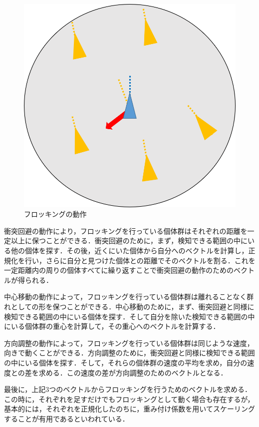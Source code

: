\documentclass[a4paper,11pt]{jarticle}
\begin{document}
\begin{figure}
\begin{minipage}{0.3\linewidth}
		\end{minipage}
		\begin{minipage}{0.3\linewidth}
			\centering
			\includegraphics[width=0.9\linewidth]{png/alighnment.png}
		\end{minipage}
		\caption[フロッキング]{フロッキングの動作}
		\label{fig:flocking}
	\end{figure}
	
	衝突回避の動作により，フロッキングを行っている個体群はそれぞれの距離を一定以上に保つことができる．衝突回避のために，まず，検知できる範囲の中にいる他の個体を探す．その後，近くにいた個体から自分へのベクトルを計算し，正規化を行い，さらに自分と見つけた個体との距離でそのベクトルを割る．これを一定距離内の周りの個体すべてに繰り返すことで衝突回避の動作のためのベクトルが得られる．
	
	中心移動の動作によって，フロッキングを行っている個体群は離れることなく群れとしての形を保つことができる．中心移動のために，まず、衝突回避と同様に検知できる範囲の中にいる個体を探す．そして自分を除いた検知できる範囲の中にいる個体群の重心を計算して，その重心へのベクトルを計算する．
	
	方向調整の動作によって，フロッキングを行っている個体群は同じような速度，向きで動くことができる．方向調整のために，衝突回避と同様に検知できる範囲の中にいる個体を探す．そして，それらの個体群の速度の平均を求め，自分の速度との差を求める．この速度の差が方向調整のためのベクトルとなる．
	
	最後に，上記3つのベクトルからフロッキングを行うためのベクトルを求める．この時に，それぞれを足すだけでもフロッキングとして動く場合も存在するが，基本的には，それぞれを正規化したのちに，重み付け係数を用いてスケーリングすることが有用であるといわれている．
	
\end{document}
